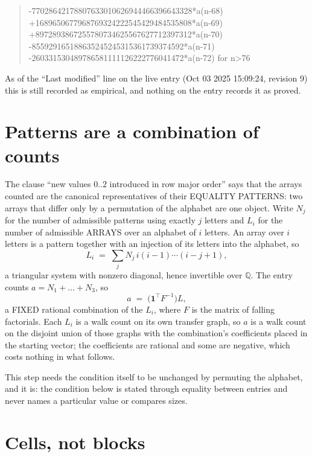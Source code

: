 \documentclass[11pt,a4paper]{article}
\theoremstyle{plain}
\theoremstyle{definition}
\begin{document}
\begin{quote}
-77028642178807633010626944466396643328*a(n-68) +1689650677968769324222545429484535808*a(n-69) +8972893867255780734625567627712397312*a(n-70) -855929165188635245245315361739374592*a(n-71) -260331530489786581111126222776041472*a(n-72) for n>76
\end{quote}
As of the ``Last modified'' line on the live entry (Oct 03 2025 15:09:24, revision 9) this is still
recorded as empirical, and nothing on the entry records it as proved.

\section{Patterns are a combination of counts}

The clause ``new values $0..2$ introduced in row major order'' says that the arrays
counted are the canonical representatives of their EQUALITY PATTERNS: two arrays that differ
only by a permutation of the alphabet are one object. Write $N_j$ for the number of admissible
patterns using exactly $j$ letters and $L_i$ for the number of admissible ARRAYS over an
alphabet of $i$ letters. An array over $i$ letters is a pattern together with an injection of
its letters into the alphabet, so
\[
L_i\;=\;\sum_{j}N_j\,i(i-1)\cdots(i-j+1),
\]
a triangular system with nonzero diagonal, hence invertible over $\mathbb{Q}$. The entry
counts $a=N_1+\dots+N_{3}$, so
\[
a\;=\;\bigl(\mathbf{1}^{\!\top}F^{-1}\bigr)L ,
\]
a FIXED rational combination of the $L_i$, where $F$ is the matrix of falling factorials.
Each $L_i$ is a walk count on its own transfer graph, so $a$ is a walk count on the disjoint
union of those graphs with the combination's coefficients placed in the starting vector; the
coefficients are rational and some are negative, which costs nothing in what follows.

This step needs the condition itself to be unchanged by permuting the alphabet, and it is:
the condition below is stated through equality between entries and never names a particular
value or compares sizes.

\section{Cells, not blocks}
\end{document}
